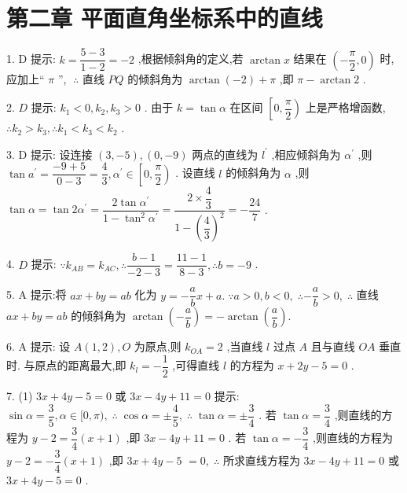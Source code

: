 \section*{第二章 平面直角坐标系中的直线}

1. D 提示: $k = \dfrac{5 - 3}{1 - 2} =  - 2$ ,根据倾斜角的定义,若 $\arctan x$ 结果在 $\left( {-\dfrac{\pi }{2},0}\right)$ 时,应加上“ $\pi$ ”, $\;\therefore$ 直线 ${PQ}$ 的倾斜角为 $\arctan \left( {-2}\right)  + \pi$ ,即 $\pi  - \arctan 2$ .

2. $D$ 提示: ${k}_{1} < 0,{k}_{2},{k}_{3} > 0$ . 由于 $k = \tan \alpha$ 在区间 $\left\lbrack  {0,\dfrac{\pi }{2}}\right)$ 上是严格增函数, $\therefore {k}_{2} > {k}_{3},\therefore {k}_{1} < {k}_{3} < {k}_{2}$ .

3. D 提示: 设连接 $\left( {3, - 5}\right) ,\left( {0, - 9}\right)$ 两点的直线为 ${l}^{\prime }$ ,相应倾斜角为 ${\alpha }^{\prime }$ ,则 $\tan {a}^{\prime } = \dfrac{-9 + 5}{0 - 3} = \dfrac{4}{3},{\alpha }^{\prime } \in  \left\lbrack  {0,\dfrac{\pi }{2}}\right)$ . 设直线 $l$ 的倾斜角为 $\alpha$ ,则 $\tan \alpha  = \tan 2{\alpha }^{\prime } = \dfrac{2\tan {\alpha }^{\prime }}{1 - {\tan }^{2}{\alpha }^{\prime }} = \dfrac{2 \times  \dfrac{4}{3}}{1 - {\left( \dfrac{4}{3}\right) }^{2}} =  - \dfrac{24}{7}$ .

4. $D$ 提示: $\because {k}_{AB} = {k}_{AC},\therefore \dfrac{b - 1}{-2 - 3} = \dfrac{{11} - 1}{8 - 3},\therefore b =  - 9$ .

5. A 提示:将 ${ax} + {by} = {ab}$ 化为 $y =  - \dfrac{a}{b}x + a.\;\because a > 0,b < 0,\;\therefore  - \dfrac{a}{b} > 0,\;\therefore$ 直线 ${ax} + {by} = {ab}$ 的倾斜角为 $\arctan \left( {-\dfrac{a}{b}}\right)  =  - \arctan \left( \dfrac{a}{b}\right) .$

6. A 提示: 设 $A\left( {1,2}\right) ,O$ 为原点,则 ${k}_{OA} = 2$ ,当直线 $l$ 过点 $A$ 且与直线 ${OA}$ 垂直时. 与原点的距离最大,即 ${k}_{l} =  - \dfrac{1}{2}$ ,可得直线 $l$ 的方程为 $x + {2y} - 5 = 0$ .

7. (1) ${3x} + {4y} - 5 = 0$ 或 ${3x} - {4y} + {11} = 0$ 提示: $\sin \alpha  = \dfrac{3}{5},\alpha  \in  \lbrack 0,\pi ),\;\therefore \;\cos \alpha  =  \pm  \dfrac{4}{5},\;\therefore \;\tan \alpha  =  \pm  \dfrac{3}{4}$ . 若 $\tan \alpha  = \dfrac{3}{4}$ ,则直线的方程为 $y - 2 = \dfrac{3}{4}\left( {x + 1}\right)$ ,即 ${3x} - {4y} + {11} = 0$ . 若 $\tan \alpha  =  - \dfrac{3}{4}$ ,则直线的方程为 $y - 2 =  - \dfrac{3}{4}\left( {x + 1}\right)$ ,即 ${3x} + {4y} - 5$  $= 0,\;\therefore$ 所求直线方程为 ${3x} - {4y} + {11} = 0$ 或 ${3x} + {4y} - 5 = 0$ .

